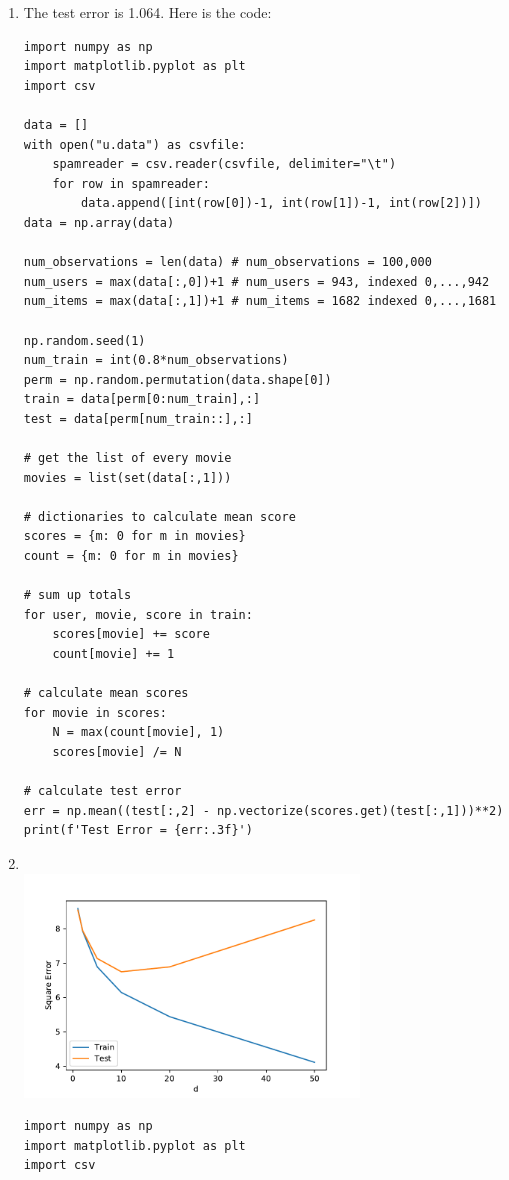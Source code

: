 \documentclass{article}
\begin{document}
\begin{enumerate}
        \item The test error is 1.064.
        Here is the code:
        \begin{verbatim}
import numpy as np
import matplotlib.pyplot as plt
import csv

data = []
with open("u.data") as csvfile:
    spamreader = csv.reader(csvfile, delimiter="\t")
    for row in spamreader:
        data.append([int(row[0])-1, int(row[1])-1, int(row[2])])
data = np.array(data)

num_observations = len(data) # num_observations = 100,000
num_users = max(data[:,0])+1 # num_users = 943, indexed 0,...,942
num_items = max(data[:,1])+1 # num_items = 1682 indexed 0,...,1681

np.random.seed(1)
num_train = int(0.8*num_observations)
perm = np.random.permutation(data.shape[0])
train = data[perm[0:num_train],:]
test = data[perm[num_train::],:]

# get the list of every movie
movies = list(set(data[:,1]))

# dictionaries to calculate mean score
scores = {m: 0 for m in movies}
count = {m: 0 for m in movies}

# sum up totals
for user, movie, score in train:
    scores[movie] += score
    count[movie] += 1

# calculate mean scores
for movie in scores:
    N = max(count[movie], 1)
    scores[movie] /= N
    
# calculate test error
err = np.mean((test[:,2] - np.vectorize(scores.get)(test[:,1]))**2)
print(f'Test Error = {err:.3f}')
        \end{verbatim}

        \newpage
        \item \, \\
        \includegraphics[width=0.7\textwidth]{code/B1b.pdf}
        \begin{verbatim}
import numpy as np
import matplotlib.pyplot as plt
import csv


\end{verbatim}
\end{enumerate}
\end{document}
